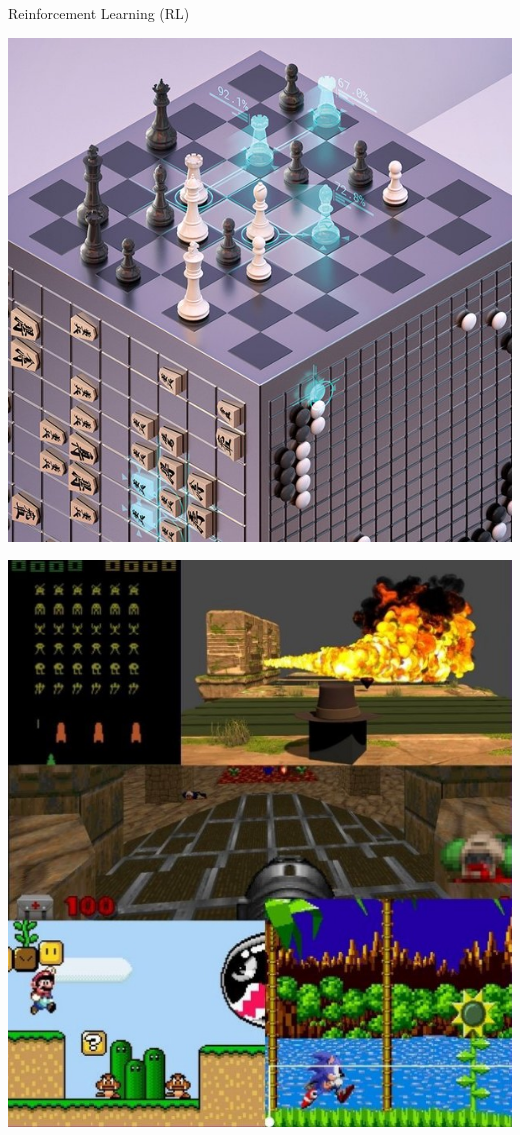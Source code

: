 \documentclass[aspectratio=1610]{beamer}
\begin{document}
\begin{frame}{Reinforcement Learning (RL)}
\begin{itemize}
\begin{minipage}[c]{0.20\textwidth}
			\includegraphics[width=\linewidth]{figures/alphazero.png}
		\end{minipage}
		\begin{minipage}[c]{0.20\textwidth}
				\includegraphics[width=\linewidth]{figures/compgames.jpg}
			\end{minipage}


\end{itemize}
\end{frame}
\end{document}
